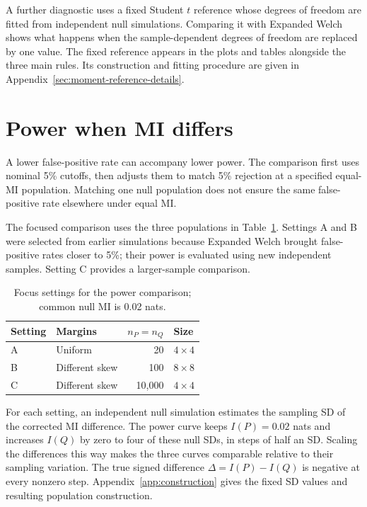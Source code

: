 A further diagnostic uses a fixed Student \(t\) reference whose degrees
of freedom are fitted from independent null simulations. Comparing it
with Expanded Welch shows what happens when the sample-dependent degrees
of freedom are replaced by one value. The fixed reference appears in
the plots and tables alongside the three main rules. Its construction
and fitting procedure are given in
Appendix~\ref{sec:moment-reference-details}.

\section{Power when MI differs}

A lower false-positive rate can accompany lower power. The comparison
first uses nominal 5\% cutoffs, then adjusts them to match 5\% rejection
at a specified equal-MI population. Matching one null population does
not ensure the same false-positive rate elsewhere under equal MI.

The focused comparison uses the three populations in
Table~\ref{tab:redesign-focus-settings}. Settings A and B were selected
from earlier simulations because Expanded Welch brought false-positive
rates closer to 5\%; their power is evaluated using new independent
samples. Setting C provides a larger-sample comparison.

\begin{table}[!htbp]
\centering
\caption{Focus settings for the power comparison; common null MI is 0.02 nats.}
\label{tab:redesign-focus-settings}
\begin{tabular}{@{}llrl@{}}
\toprule Setting & Margins & \(n_P=n_Q\) & Size\\\midrule
A & Uniform & 20 & \(4\times4\)\\
B & Different skew & 100 & \(8\times8\)\\
C & Different skew & 10,000 & \(4\times4\)\\
\bottomrule
\end{tabular}
\end{table}

For each setting, an independent null simulation estimates the sampling
SD of the corrected MI difference. The power curve keeps \(I(P)=0.02\)
nats and increases \(I(Q)\) by zero to four of these null SDs, in steps
of half an SD. Scaling the differences this way makes the three curves
comparable relative to their sampling variation. The true signed
difference \(\Delta=I(P)-I(Q)\) is negative at every nonzero step.
Appendix~\ref{app:construction} gives the fixed SD values and resulting
population construction.

